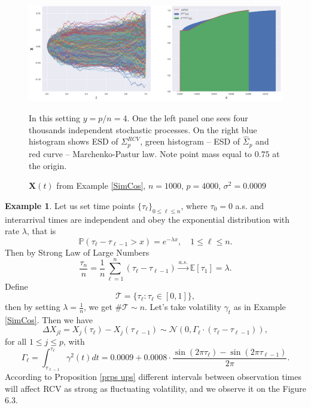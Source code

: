 \documentclass[a4paper,11pt]{book}
\theoremstyle{plain}
\theoremstyle{definition}
\newtheorem{exmp}[thm]{Example}
\newcommand{\ME}{\mathbb{E}}
\newcommand{\MP}{\mathbb{P}}
\begin{document}
    \begin{figure}[ht]
    	\begin{center} \centering
    		\includegraphics[scale=0.4]{XCos2}
    		\caption{ $\mathbf{X}(t)$ from Example \ref{SimCos}, $n = 1000$, $p=4000$, $\sigma^2 = 0.0009$ }
    		\smallskip
    		\small
    		In this setting $y = p/n = 4$. One the left panel one sees four thousands independent stochastic processes. On the right blue histogram shows ESD of $\Sigma_p^{RCV}$, green histogram -- ESD of $\widehat{\Sigma}_p$ and red curve -- Marchenko-Pastur law. Note point mass equal to $0.75$ at the origin.
    	\end{center}
    \end{figure}
    
    \begin{exmp} \label{PosTimes}
    	Let us set time points $ \{\tau_\ell\}_{0 \leq \ell \leq n}$, where $\tau_0 = 0$ a.s. and interarrival times are independent and obey the exponential distribution with rate $\lambda$, that is 
    	\[ \MP(\tau_{\ell} - \tau_{\ell-1} > x) =  e^{-\lambda x}, \quad 1 \leq \ell \leq n. \]
    	Then by Strong Law of Large Numbers
    	\[ \frac{\tau_n}{n} = \frac{1}{n} \sum_{\ell=1}^{n} (\tau_{\ell} - \tau_{\ell-1}) \xrightarrow{a.s.} \ME[\tau_1] = \lambda. \]
    	Define
    	\[ \mathcal{T} = \{\tau_\ell : \tau_\ell \in [0, 1]\}, \]
    	then by setting $\lambda = \frac{1}{n}$, we get $\#\mathcal{T} \sim n$.
    	Let's take volatility $\gamma_t$ as in Example \ref{SimCos}. Then we have 
    	\[ \Delta X_{jl} = X_j(\tau_\ell) - X_j(\tau_{\ell-1}) \sim \mathcal{N}(0, \Gamma_\ell \cdot (\tau_\ell - \tau_{\ell-1})), \]
    	for all $1 \leq j \leq p$, with
    	\[ \Gamma_\ell = \int_{\tau_{\ell-1}}^{\tau_\ell} \gamma^2(t)dt = 0.0009 + 0.0008\cdot \frac{ \sin(2\pi \tau_\ell )-\sin(2\pi \tau_{\ell-1} ) }{2\pi}. \]
    	According to Proposition \ref{prps ups} different intervals between observation times will affect RCV as strong as fluctuating volatility, and we observe it on the Figure 6.3.
    \end{exmp}
    
\end{document}
